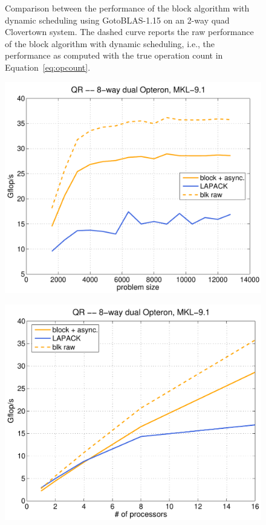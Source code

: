 \documentclass[runningheads]{llncs}
\begin{document}
\begin{figure}
\begin{minipage}[tr]{0.5\textwidth}
\begin{center}
\end{center}
\end{minipage}
\caption{\label{fig:goto_clov}Comparison between the performance of the
block algorithm with dynamic scheduling using GotoBLAS-1.15 on an
2-way quad Clovertown system. The dashed curve reports the
raw performance of the block algorithm with dynamic scheduling, i.e.,
the performance as computed with the true operation count in Equation~\eqref{eq:opcount}.}
\end{figure}

\begin{figure}
\begin{minipage}[tl]{0.5\textwidth}
\begin{center}
{\includegraphics[width=1\textwidth]{images/mkl_opt_16.pdf}}
\end{center}
\end{minipage}
\hspace{0.25cm}
\begin{minipage}[tr]{0.5\textwidth}
\begin{center}
{\includegraphics[width=1\textwidth]{images/mkl_opt_scal.pdf}}

\end{center}
\end{minipage}
\end{figure}
\end{document}
